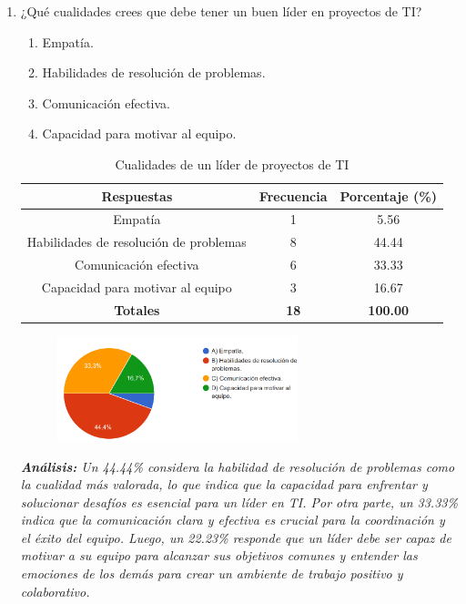 \documentclass[journal]{IEEEtran}
\begin{document}
\begin{enumerate}
	\item ¿Qué cualidades crees que debe tener un buen líder en proyectos de TI?
	\begin{enumerate}
		\item Empatía.
		\item Habilidades de resolución de problemas.
		\item Comunicación efectiva.
		\item Capacidad para motivar al equipo.
	\end{enumerate}
	\begin{table}[H]
		\renewcommand{\arraystretch}{1.3}
		\centering
		\caption{Cualidades de un líder de proyectos de TI}
		\begin{tabular}{c c c}
			\hline
			\textbf{Respuestas} & \textbf{Frecuencia} & \textbf{Porcentaje (\%)}\\
			\hline
			Empatía & 1 & 5.56\\
			Habilidades de resolución de problemas & 8 & 44.44\\
			Comunicación efectiva & 6 & 33.33\\
			Capacidad para motivar al equipo & 3 & 16.67\\
			\hline
			\textbf{Totales} &\textbf{18}& \textbf{100.00}\\
			\hline
		\end{tabular}
	\end{table}
	\begin{figure}[h]
		\centering
		\includegraphics[width=07cm]{Pregunta17}
	\end{figure}
	\textit{\textbf{Análisis:} Un 44.44\% considera la habilidad de resolución de problemas como la cualidad más valorada, lo que indica que la capacidad para enfrentar y solucionar desafíos es esencial para un líder en TI. Por otra parte, un 33.33\% indica que la comunicación clara y efectiva es crucial para la coordinación y el éxito del equipo. Luego, un 22.23\% responde que un líder debe ser capaz de motivar a su equipo para alcanzar sus objetivos comunes y entender las emociones de los demás para crear un ambiente de trabajo positivo y colaborativo.}\\
		

\end{enumerate}
\end{document}
